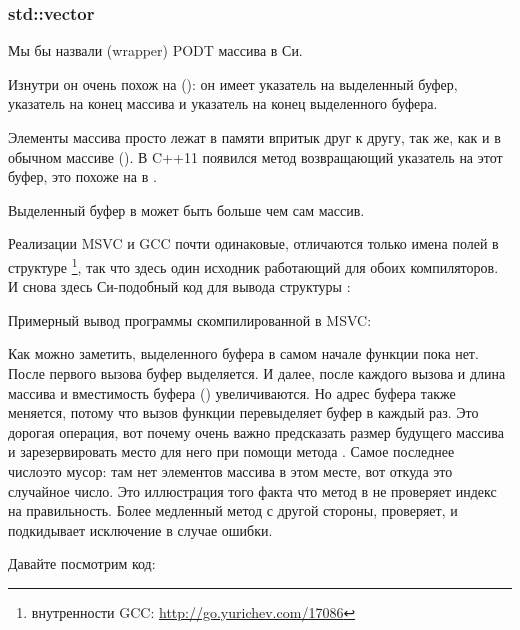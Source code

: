 \subsubsection{std::vector}

Мы бы назвали   (wrapper) \ac{PODT} массива в Си.

Изнутри он очень похож на  ():
он имеет указатель на выделенный буфер, указатель на конец массива и указатель на конец выделенного буфера.

Элементы массива просто лежат в памяти впритык друг к другу, так же, как и в обычном массиве ().
В C++11 появился метод  возвращающий указатель на этот буфер, это похоже на  в .

Выделенный буфер в  может быть больше чем сам массив.

Реализации MSVC и GCC почти одинаковые, отличаются только имена полей в структуре
\footnote
{внутренности GCC: \url{http://go.yurichev.com/17086}}, так что здесь один исходник работающий для обоих компиляторов.
И снова здесь Си-подобный код для вывода структуры :



Примерный вывод программы скомпилированной в MSVC:



Как можно заметить, выделенного буфера в самом начале функции \main пока нет.
После первого вызова  буфер выделяется.
И далее, после каждого вызова  
и длина массива и вместимость буфера () увеличиваются.
Но адрес буфера также меняется, потому что вызов функции  перевыделяет буфер в 
каждый раз.
Это дорогая операция, вот почему очень важно предсказать размер будущего массива и зарезервировать место для него
при помощи метода .
Самое последнее число\EMDASH{}это мусор: там нет элементов массива в этом месте, вот откуда это случайное число.
Это иллюстрация того факта что метод  в  не проверяет индекс на правильность.
Более медленный метод  с другой стороны, проверяет, и подкидывает исключение  
в случае ошибки.

Давайте посмотрим код:



